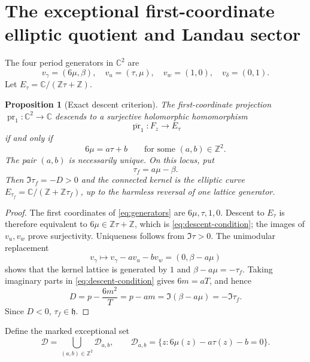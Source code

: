 \documentclass[11pt]{article}
\numberwithin{equation}{section}
\newtheorem{proposition}[theorem]{Proposition}
\theoremstyle{definition}
\theoremstyle{remark}
\newcommand{\C}{\mathbb C}
\newcommand{\Z}{\mathbb Z}
\begin{document}
\section{The exceptional first-coordinate elliptic quotient and Landau sector}

The four period generators in $\C^2$ are
\begin{equation}\label{eq:generators}
 v_\gamma=(6\mu,\beta),\quad
 v_u=(\tau,\mu),\quad
 v_w=(1,0),\quad
 v_\delta=(0,1).
\end{equation}
Let $E_\tau=\C/(\Z\tau+\Z)$.

\begin{proposition}[Exact descent criterion]\label{prop:descent}
The first-coordinate projection $\operatorname{pr}_1:\C^2\to\C$ descends to a surjective holomorphic homomorphism
\[
 \overline{\operatorname{pr}}_1:F_z\longrightarrow E_\tau
\]
if and only if
\begin{equation}\label{eq:descent-condition}
 6\mu=a\tau+b
 \qquad\text{for some }(a,b)\in\Z^2.
\end{equation}
The pair $(a,b)$ is necessarily unique.
On this locus, put
\begin{equation}\label{eq:tau-f}
 \tau_f=a\mu-\beta.
\end{equation}
Then $\Im\tau_f=-D>0$ and the connected kernel is the elliptic curve
$E_{\tau_f}=\C/(\Z+\Z\tau_f)$, up to the harmless reversal of one lattice generator.
\end{proposition}

\begin{proof}
The first coordinates of \eqref{eq:generators} are $6\mu,\tau,1,0$.  Descent to $E_\tau$ is therefore equivalent to $6\mu\in\Z\tau+\Z$, which is \eqref{eq:descent-condition}; the images of $v_u,v_w$ prove surjectivity.  Uniqueness follows from $\Im\tau>0$.  The unimodular replacement
\[
 v_\gamma\longmapsto v_\gamma-av_u-bv_w=(0,\beta-a\mu)
\]
shows that the kernel lattice is generated by $1$ and $\beta-a\mu=-\tau_f$.  Taking imaginary parts in \eqref{eq:descent-condition} gives $6m=aT$, and hence
\[
 D=p-\frac{6m^2}{T}=p-am=\Im(\beta-a\mu)=-\Im\tau_f.
\]
Since $D<0$, $\tau_f\in\mathfrak h$.
\end{proof}

Define the marked exceptional set
\begin{equation}\label{eq:descent-locus}
 \mathcal D=\bigcup_{(a,b)\in\Z^2}
 \mathcal D_{a,b},
 \qquad
 \mathcal D_{a,b}=\{z:6\mu(z)-a\tau(z)-b=0\}.
\end{equation}
\end{document}
